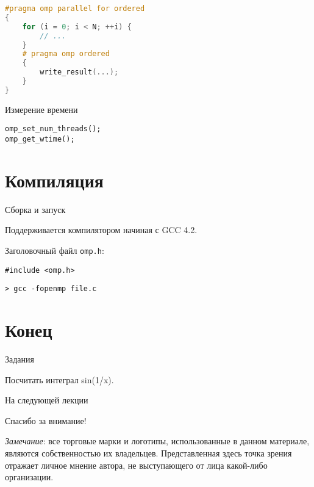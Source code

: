 \begin{frame}[fragile]

\begin{lstlisting}[language=C++,basicstyle=\ttfamily,keywordstyle=\color{blue},basicstyle=\scriptsize]
#pragma omp parallel for ordered
{
    for (i = 0; i < N; ++i) {
        // ...
    }
    # pragma omp ordered
    {
        write_result(...);
    }
}
\end{lstlisting}

\end{frame}

\begin{frame}[fragile]{Измерение времени}

\begin{lstlisting}
omp_set_num_threads();
omp_get_wtime();
\end{lstlisting}

\end{frame}

\section{Компиляция}

\begin{frame}[fragile]{Сборка и запуск}

Поддерживается компилятором начиная с GCC 4.2.

Заголовочный файл \texttt{omp.h}:

\begin{lstlisting}
#include <omp.h>
\end{lstlisting}

\begin{lstlisting}
> gcc -fopenmp file.c
\end{lstlisting}

\end{frame}

\section*{Конец}

\begin{frame}{Задания}

Посчитать интеграл sin(1/x).

\end{frame}

\begin{frame}{На следующей лекции}
\end{frame}

\begin{frame}

{\huge{Спасибо за внимание!}\par}

\vfill

\tiny{\textit{Замечание}: все торговые марки и логотипы, использованные в данном материале, являются собственностью их владельцев. Представленная здесь точка зрения отражает личное мнение автора, не выступающего от лица какой-либо организации.}

\end{frame}


